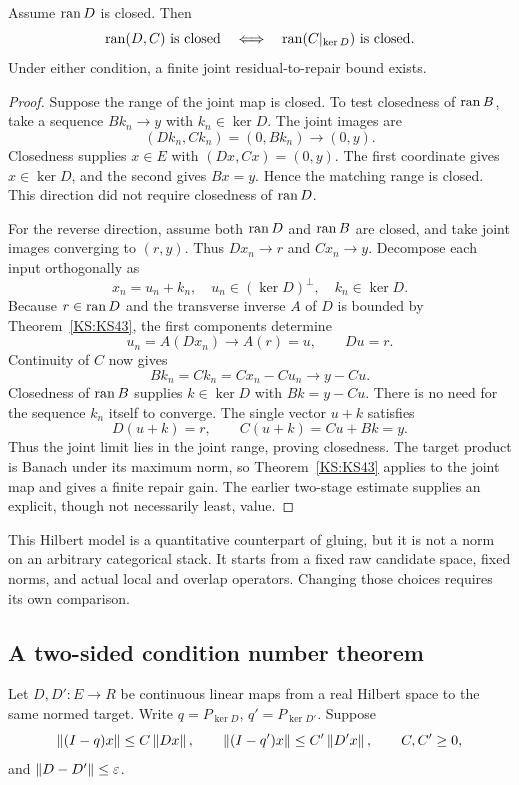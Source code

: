 \begin{KStheorem}\label{KS:KS47}
Assume \(\operatorname{ran} D\) is closed. Then
\[
 \operatorname{ran}(D,C)\text{ is closed}\quad\Longleftrightarrow\quad
 \operatorname{ran}(C|_{\ker D})\text{ is closed}.
\]
Under either condition, a finite joint residual-to-repair bound exists.
\end{KStheorem}
\begin{proof}
Suppose the range of the joint map is closed. To test closedness of $\operatorname{ran} B$, take a sequence $Bk_n\to y$ with $k_n\in\ker D$. The joint images are
\[
 (Dk_n,Ck_n)=(0,Bk_n)\longrightarrow(0,y).
\]
Closedness supplies $x\in E$ with $(Dx,Cx)=(0,y)$. The first coordinate gives $x\in\ker D$, and the second gives $Bx=y$. Hence the matching range is closed. This direction did not require closedness of $\operatorname{ran} D$.

For the reverse direction, assume both $\operatorname{ran} D$ and $\operatorname{ran} B$ are closed, and take joint images converging to $(r,y)$. Thus $Dx_n\to r$ and $Cx_n\to y$. Decompose each input orthogonally as
\[
 x_n=u_n+k_n,\quad
 u_n\in(\ker D)^\perp,\quad k_n\in\ker D.
\]
Because $r\in\operatorname{ran} D$ and the transverse inverse $A$ of $D$ is bounded by Theorem~\ref{KS:KS43}, the first components determine
\[
 u_n=A(Dx_n)\longrightarrow A(r)=u,
 \qquad Du=r.
\]
Continuity of $C$ now gives
\[
 Bk_n=Ck_n=Cx_n-Cu_n\longrightarrow y-Cu.
\]
Closedness of $\operatorname{ran} B$ supplies $k\in\ker D$ with $Bk=y-Cu$. There is no need for the sequence $k_n$ itself to converge. The single vector $u+k$ satisfies
\[
 D(u+k)=r,
 \qquad C(u+k)=Cu+Bk=y.
\]
Thus the joint limit lies in the joint range, proving closedness. The target product is Banach under its maximum norm, so Theorem~\ref{KS:KS43} applies to the joint map and gives a finite repair gain. The earlier two-stage estimate supplies an explicit, though not necessarily least, value.
\end{proof}


This Hilbert model is a quantitative counterpart of gluing, but it is not a norm on an arbitrary categorical stack. It starts from a fixed raw candidate space, fixed norms, and actual local and overlap operators. Changing those choices requires its own comparison.

\label{KS:sec:motion}
\subsection{A two-sided condition number theorem}
Let \(D,D':E\to R\) be continuous linear maps from a real Hilbert space to the same normed target. Write \(q=P_{\ker D}\), \(q'=P_{\ker D'}\). Suppose
\[
 \left\lVert(I-q)x\right\rVert\le C\left\lVert Dx\right\rVert,\qquad
 \left\lVert(I-q')x\right\rVert\le C'\left\lVert D'x\right\rVert,\qquad C,C'\ge0,
\]
and \(\left\lVert D-D'\right\rVert\le\varepsilon\).


